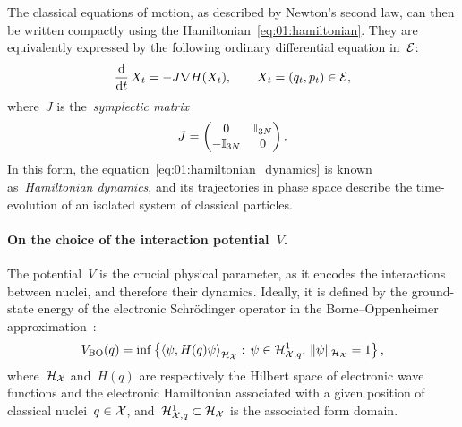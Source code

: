 The classical equations of motion, as described by Newton's second law, can then be written compactly using the Hamiltonian~\eqref{eq:01:hamiltonian}. They are equivalently expressed by the following ordinary differential equation in~$\mathcal{E}$:
\begin{equation}
    \label{eq:01:hamiltonian_dynamics}
    \frac{\mathrm{d}}{\mathrm{d} t}\,X_t = -J\nabla H(X_t),\qquad X_t = (q_t,p_t)\in \mathcal{E},
\end{equation}
where~$J$ is the~\textit{symplectic matrix}
\begin{equation}
    \label{eq:01:J}
    J=\begin{pmatrix}
        0&\mathbb{I}_{3N}\\-\mathbb{I}_{3N}&0
    \end{pmatrix}.
\end{equation}
In this form, the equation~\eqref{eq:01:hamiltonian_dynamics} is known as~\textit{Hamiltonian dynamics}, and its trajectories in phase space describe the time-evolution of an isolated system of classical particles.

\paragraph{On the choice of the interaction potential~$V$.}
The potential~$V$ is the crucial physical parameter, as it encodes the interactions between nuclei, and therefore their dynamics. Ideally, it is defined by the ground-state energy of the electronic Schr\"odinger operator in the Borne--Oppenheimer approximation~\cite{BO27}:
\begin{equation}
    \label{eq:01:schrodinger}
    V_{\mathrm{BO}}(q) = \inf\left\{\left\langle\psi, H(q) \psi\right\rangle_{\mathcal H_{\mathcal{X}}}:\,\psi \in \mathcal H^1_{\mathcal{X},q},\,\|\psi\|_{\mathcal H_{\mathcal{X}}}=1\right\},
\end{equation}
where~$\mathcal H_{\mathcal{X}}$ and~$H(q)$ are respectively the Hilbert space of electronic wave functions and the electronic Hamiltonian associated with a given position of classical nuclei~$q\in\mathcal{X}$, and~$\mathcal H^1_{\mathcal{X},q}\subset \mathcal H_{\mathcal{X}}$ is the associated form domain.

